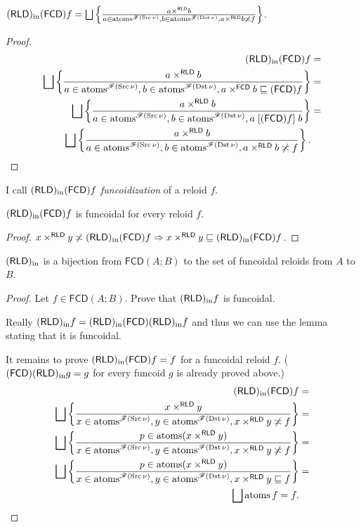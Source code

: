 \begin{prop}
$(\mathsf{RLD})_{\mathrm{in}}(\mathsf{FCD}) f=\bigsqcup\left\{ \frac{a\times^{\mathsf{RLD}}b}{a\in\operatorname{atoms}^{\mathscr{F}(\operatorname{Src}\nu)},b\in\operatorname{atoms}^{\mathscr{F}(\operatorname{Dst}\nu)},a\times^{\mathsf{RLD}}b\not\asymp f}\right\}$.\end{prop}
\begin{proof}
~
\begin{align*}
(\mathsf{RLD})_{\mathrm{in}}(\mathsf{FCD}) f & =\\
\bigsqcup\left\{ \frac{a\times^{\mathsf{RLD}}b}{a\in\operatorname{atoms}^{\mathscr{F}(\operatorname{Src}\nu)},b\in\operatorname{atoms}^{\mathscr{F}(\operatorname{Dst}\nu)},a\times^{\mathsf{FCD}}b\sqsubseteq(\mathsf{FCD}) f}\right\} & =\\
\bigsqcup\left\{ \frac{a\times^{\mathsf{RLD}}b}{a\in\operatorname{atoms}^{\mathscr{F}(\operatorname{Src}\nu)},b\in\operatorname{atoms}^{\mathscr{F}(\operatorname{Dst}\nu)},a\mathrel{\left[(\mathsf{FCD}) f\right]}b}\right\} & =\\
\bigsqcup\left\{ \frac{a\times^{\mathsf{RLD}}b}{a\in\operatorname{atoms}^{\mathscr{F}(\operatorname{Src}\nu)},b\in\operatorname{atoms}^{\mathscr{F}(\operatorname{Dst}\nu)},a\times^{\mathsf{RLD}}b\not\asymp f}\right\}.
\end{align*}
\end{proof}
\begin{defn}
I call $(\mathsf{RLD})_{\mathrm{in}}(\mathsf{FCD}) f$ \emph{funcoidization} of a reloid $f$.\end{defn}
\begin{lem}
$(\mathsf{RLD})_{\mathrm{in}}(\mathsf{FCD}) f$ is funcoidal for every reloid $f$.\end{lem}
\begin{proof}
$x\times^{\mathsf{RLD}}y\not\asymp(\mathsf{RLD})_{\mathrm{in}}(\mathsf{FCD}) f\Rightarrow x\times^{\mathsf{RLD}}y\sqsubseteq(\mathsf{RLD})_{\mathrm{in}}(\mathsf{FCD}) f$.\end{proof}
\begin{thm}
$(\mathsf{RLD})_{\mathrm{in}}$ is a bijection from $\mathsf{FCD}(A;B)$ to the set of
funcoidal reloids from $A$ to $B$.\end{thm}
\begin{proof}
Let $f\in\mathsf{FCD}(A;B)$. Prove that $(\mathsf{RLD})_{\mathrm{in}} f$ is funcoidal.

Really $(\mathsf{RLD})_{\mathrm{in}} f=(\mathsf{RLD})_{\mathrm{in}}(\mathsf{FCD})(\mathsf{RLD})_{\mathrm{in}} f$ and thus we can use
the lemma stating that it is funcoidal.

It remains to prove $(\mathsf{RLD})_{\mathrm{in}}(\mathsf{FCD}) f=f$ for a funcoidal reloid $f$.
($(\mathsf{FCD})(\mathsf{RLD})_{\mathrm{in}} g=g$ for every funcoid $g$ is already proved above.)
\begin{align*}
(\mathsf{RLD})_{\mathrm{in}}(\mathsf{FCD}) f & =\\
\bigsqcup\left\{ \frac{x\times^{\mathsf{RLD}}y}{x\in\operatorname{atoms}^{\mathscr{F}(\operatorname{Src}\nu)},y\in\operatorname{atoms}^{\mathscr{F}(\operatorname{Dst}\nu)},x\times^{\mathsf{RLD}}y\not\asymp f}\right\} & =\\
\bigsqcup\left\{ \frac{p\in\operatorname{atoms}(x\times^{\mathsf{RLD}}y)}{x\in\operatorname{atoms}^{\mathscr{F}(\operatorname{Src}\nu)},y\in\operatorname{atoms}^{\mathscr{F}(\operatorname{Dst}\nu)},x\times^{\mathsf{RLD}}y\not\asymp f}\right\} & =\\
\bigsqcup\left\{ \frac{p\in\operatorname{atoms}(x\times^{\mathsf{RLD}}y)}{x\in\operatorname{atoms}^{\mathscr{F}(\operatorname{Src}\nu)},y\in\operatorname{atoms}^{\mathscr{F}(\operatorname{Dst}\nu)},x\times^{\mathsf{RLD}}y\sqsubseteq f}\right\} & =\\
\bigsqcup\operatorname{atoms} f=f.
\end{align*}
\end{proof}
